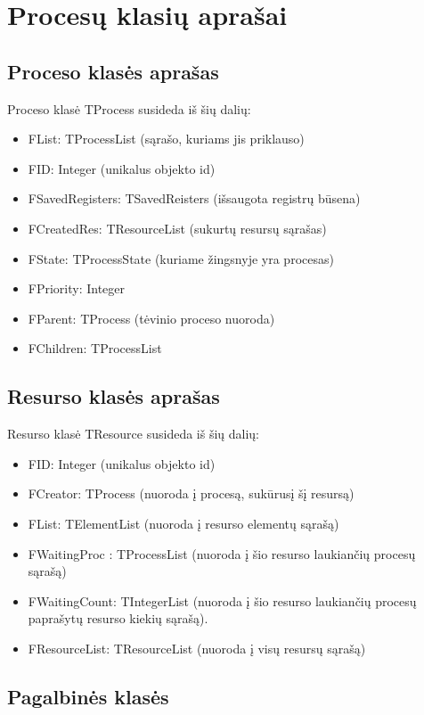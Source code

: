 \documentclass{VUMIFInfKursinis}
\begin{document}
\section{Procesų klasių aprašai}

\subsection{Proceso klasės aprašas}

Proceso klasė TProcess susideda iš šių dalių:

\begin{itemize}
	\item FList: TProcessList (sąrašo, kuriams jis priklauso)
	\item FID: Integer (unikalus objekto id)
	\item FSavedRegisters: TSavedReisters (išsaugota registrų būsena)
	\item FCreatedRes: TResourceList (sukurtų resursų sąrašas)
	\item FState: TProcessState (kuriame žingsnyje yra procesas)
	\item FPriority: Integer
	\item FParent: TProcess (tėvinio proceso nuoroda)
	\item FChildren: TProcessList
\end{itemize}

\subsection{Resurso klasės aprašas}

Resurso klasė TResource susideda iš šių dalių:

\begin{itemize}
	\item FID: Integer (unikalus objekto id)
	\item FCreator: TProcess (nuoroda į procesą, sukūrusį šį resursą)
	\item FList: TElementList (nuoroda į resurso elementų sąrašą)
	\item FWaitingProc : TProcessList (nuoroda į šio resurso laukiančių procesų sąrašą)
	\item FWaitingCount: TIntegerList (nuoroda į šio resurso laukiančių procesų paprašytų
	resurso kiekių sąrašą).
	\item FResourceList: TResourceList (nuoroda į visų resursų sąrašą)
\end{itemize}

\subsection{Pagalbinės klasės}
\end{document}

